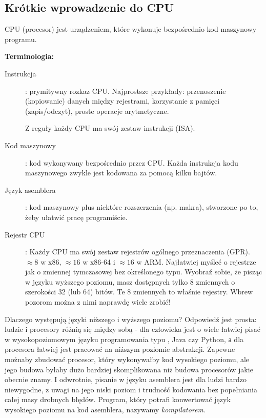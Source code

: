 \subsection{Krótkie wprowadzenie do CPU}

\ac{CPU} (procesor) jest urządzeniem, które wykonuje bezpośrednio kod maszynowy programu.

\textbf{Terminologia:}

\begin{description}
\item[Instrukcja]: prymitywny rozkaz \ac{CPU}.
Najprostsze przykłady: przenoszenie (kopiowanie) danych między rejestrami, korzystanie z pamięci (zapis/odczyt), proste operacje arytmetyczne.

Z reguły każdy \ac{CPU} ma swój zestaw instrukcji (\ac{ISA}).

\item[Kod maszynowy]: kod wykonywany bezpośrednio przez \ac{CPU}. 
Każda instrukcja kodu maszynowego zwykle jest kodowana za pomocą kilku bajtów.
\item[Język asemblera]: kod maszynowy plus niektóre rozszerzenia (np. makra), stworzone po to, żeby ułatwić pracę programiście.
\item[Rejestr CPU]: Każdy \ac{CPU} ma swój zestaw rejestrów ogólnego przeznaczenia (\ac{GPR}).
$\approx 8$ w x86, $\approx 16$ w x86-64 i $\approx 16$ w ARM.
Najłatwiej myśleć o rejestrze jak o zmiennej tymczasowej bez określonego typu.
Wyobraź sobie, że pisząc w języku wyższego poziomu, masz dostępnych tylko 8 zmiennych o szerokości 32 (lub 64) bitów.
Te 8 zmiennych to właśnie rejestry. Wbrew pozorom można z nimi naprawdę wiele zrobić!
\end{description}

Dlaczego występują języki niższego i wyższego poziomu? Odpowiedź jest prosta: ludzie i procesory różnią się między sobą - dla człowieka jest o wiele łatwiej pisać w wysokopoziomowym języku programowania typu \CCpp, Java czy Python, а dla procesora łatwiej jest pracować na niższym poziomie abstrakcji.
Zapewne możnaby zbudować procesor, który wykonywałby kod wysokiego poziomu, ale jego budowa byłaby dużo bardziej skomplikowana niż  budowa procesorów jakie obecnie znamy.
I odwrotnie, pisanie w języku asemblera jest dla ludzi bardzo niewygodne, z uwagi na jego niski poziom i trudność kodowania bez popełniania całej masy drobnych błędów.
Program, który potrafi konwertować język wysokiego poziomu na kod asemblera, nazywamy \emph{kompilatorem}.

%
%
%

